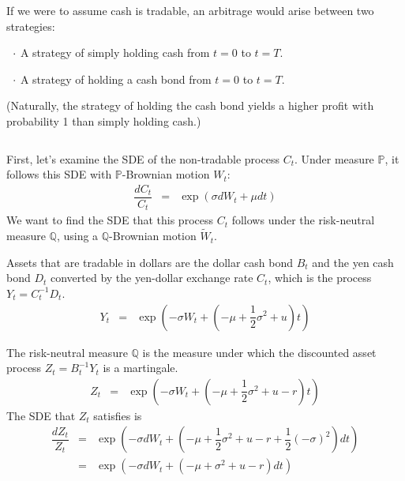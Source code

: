 \documentclass[uplatex,a4j,12pt,dvipdfmx]{jsarticle}
\begin{document}
If we were to assume cash is tradable, an arbitrage would arise between two strategies:

$ \hspace{2mm} \cdot$ A strategy of simply holding cash from $t=0$ to $t=T$.

$ \hspace{2mm} \cdot$ A strategy of holding a cash bond from $t=0$ to $t=T$.

(Naturally, the strategy of holding the cash bond yields a higher profit with probability 1 than simply holding cash.)

${}$

First, let's examine the SDE of the non-tradable process $C_{t}$.
Under measure $\mathbb{P}$, it follows this SDE with $\mathbb{P}$-Brownian motion $W_{t}$:
%
%
\begin{eqnarray*}
	\dfrac{dC_{t}}{C_{t}}
	&=&
	\exp \left( \sigma dW_{t} + \mu dt \right)
\end{eqnarray*}
%
%
We want to find the SDE that this process $C_{t}$ follows under the risk-neutral measure $\mathbb{Q}$, using a $\mathbb{Q}$-Brownian motion $\tilde{W}_{t}$.

Assets that are tradable in dollars are the dollar cash bond $B_{t}$ and the yen cash bond $D_{t}$ converted by the yen-dollar exchange rate $C_{t}$, which is the process $Y_{t} = C^{-1}_{t}D_{t}$.
%
%
\begin{eqnarray*}
	Y_{t}
	&=&
	\exp \left( - \sigma W_{t} + \left( - \mu + \dfrac{1}{2} \sigma^{2} + u \right) t \right)
\end{eqnarray*}
%
%

The risk-neutral measure $\mathbb{Q}$ is the measure under which the discounted asset process $Z_{t} = B^{-1}_{t} Y_{t}$ is a martingale.
%
%
\begin{eqnarray*}
	Z_{t}
	&=&
	\exp \left( - \sigma W_{t} + \left( - \mu + \dfrac{1}{2} \sigma^{2} + u - r \right) t \right)
\end{eqnarray*}
%
%
The SDE that $Z_{t}$ satisfies is
%
%
\begin{eqnarray*}
	\dfrac{d Z_{t}}{Z_{t}}
	&=&
	\exp \left( - \sigma d W_{t} + \left( - \mu + \dfrac{1}{2} \sigma^{2} + u - r + \dfrac{1}{2} (-\sigma)^{2} \right) d t \right)
	\\ &=&
	\exp \left( - \sigma d W_{t} + \left( - \mu + \sigma^{2} + u - r \right) d t \right)
\end{eqnarray*}
%
%
\end{document}

